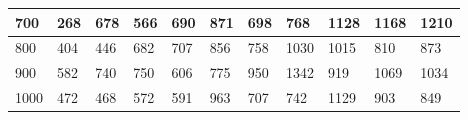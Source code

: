 \documentclass[10pt,letterpaper]{article}
\begin{document}
\begin{center}
\begin{table}
\begin{tabular} { |m{0.5cm}|m{1.3cm}|m{1.3cm}|m{1.3cm}|m{1.3cm}|m{1.3cm}|m{1.3cm}|m{1.3cm}|m{1.3cm}|m{1.3cm}|m{1.3cm}|}
\hline
\cellcolor{Gray}700 & \Large 268 & \Large 678 & \Large 566 & \Large 690 & \Large 871 & \Large 698 & \Large 768 & \Large 1128 & \Large 1168 & \Large 1210 \\
\hline
\cellcolor{Gray}800 & \Large 404 & \Large 446 & \Large 682 & \Large 707 & \Large 856 & \Large 758 & \Large 1030 & \Large 1015 & \Large 810 & \Large 873 \\
\hline
\cellcolor{Gray}900 & \Large 582 & \Large 740 & \Large 750 & \Large 606 & \Large 775 & \Large 950 & \Large 1342 & \Large 919 & \Large 1069 & \Large 1034 \\
\hline
\cellcolor{Gray}1000 & \Large 472 & \Large 468 & \Large 572 & \Large 591 & \Large 963 & \Large 707 & \Large 742 & \Large 1129 & \Large 903 & \Large 849 \\
\hline
\end{tabular} \\
\end{table}
\end{center}
\newpage 
{}
\end{document}
